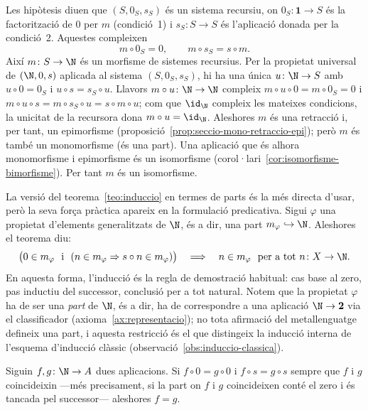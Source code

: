 \begin{prova}
Les hipòtesis diuen que \((S,0_S,s_S)\) és un sistema recursiu, on
\(0_S\colon\mathbf1\to S\) és la factorització de \(0\) per \(m\)
(condició~1) i \(s_S\colon S\to S\) és l'aplicació donada per la
condició~2. Aquestes compleixen
\[
m\circ 0_S=0,
\qquad
m\circ s_S=s\circ m .
\]
Així \(m\colon S\to\N\) és un morfisme de sistemes recursius. Per la
propietat universal de \((\N,0,s)\) aplicada al sistema \((S,0_S,s_S)\),
hi ha una única \(u\colon\N\to S\) amb \(u\circ 0=0_S\) i
\(u\circ s=s_S\circ u\). Llavors \(m\circ u\colon\N\to\N\) compleix
\(m\circ u\circ 0=m\circ 0_S=0\) i
\(m\circ u\circ s=m\circ s_S\circ u=s\circ m\circ u\); com que \(\id_\N\)
compleix les mateixes condicions, la unicitat de la recursora dona
\(m\circ u=\id_\N\). Aleshores \(m\) és una retracció i, per tant, un
epimorfisme (proposició~\ref{prop:seccio-mono-retraccio-epi}); però \(m\)
és també un monomorfisme (és una part). Una aplicació que és alhora
monomorfisme i epimorfisme és un isomorfisme
(corol·lari~\ref{cor:isomorfisme-bimorfisme}). Per tant \(m\) és un
isomorfisme.
\end{prova}

\begin{observacio}\label{obs:induccio-generalitzada}
La versió del teorema~\ref{teo:induccio} en termes de parts és la més
directa d'usar, però la seva força pràctica apareix en la formulació
predicativa. Sigui \(\varphi\) una propietat d'elements generalitzats de
\(\N\), és a dir, una part \(m_\varphi\hookrightarrow\N\). Aleshores el
teorema diu:
\[
\bigl(0\in m_\varphi\ \text{ i }\ (n\in m_\varphi\Rightarrow s\circ
n\in m_\varphi)\bigr)
\quad\Longrightarrow\quad
n\in m_\varphi\ \text{ per a tot } n\colon X\to\N .
\]
En aquesta forma, l'inducció és la regla de demostració habitual: cas
base al zero, pas inductiu del successor, conclusió per a tot natural.
Notem que la propietat \(\varphi\) ha de ser una \emph{part} de \(\N\),
és a dir, ha de correspondre a una aplicació \(\N\to\mathbf2\) via el
classificador (axioma~\ref{ax:representacio}); no tota afirmació del
metallenguatge defineix una part, i aquesta restricció és el que
distingeix la inducció interna de l'esquema d'inducció clàssic
(observació~\ref{obs:induccio-classica}).
\end{observacio}

\begin{proposicio}\label{prop:unicitat-induccio}
Siguin \(f,g\colon\N\to A\) dues aplicacions. Si \(f\circ 0=g\circ 0\) i
\(f\circ s=g\circ s\) sempre que \(f\) i \(g\) coincideixin ---més
precisament, si la part on \(f\) i \(g\) coincideixen conté el zero i és
tancada pel successor--- aleshores \(f=g\).
\end{proposicio}

